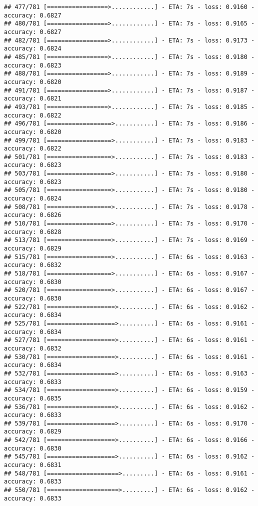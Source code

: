 \documentclass[
]{article}
\begin{document}
\begin{verbatim}
## 477/781 [=================>............] - ETA: 7s - loss: 0.9160 - accuracy: 0.6827
## 480/781 [=================>............] - ETA: 7s - loss: 0.9165 - accuracy: 0.6827
## 482/781 [=================>............] - ETA: 7s - loss: 0.9173 - accuracy: 0.6824
## 485/781 [=================>............] - ETA: 7s - loss: 0.9180 - accuracy: 0.6823
## 488/781 [=================>............] - ETA: 7s - loss: 0.9189 - accuracy: 0.6820
## 491/781 [=================>............] - ETA: 7s - loss: 0.9187 - accuracy: 0.6821
## 493/781 [=================>............] - ETA: 7s - loss: 0.9185 - accuracy: 0.6822
## 496/781 [==================>...........] - ETA: 7s - loss: 0.9186 - accuracy: 0.6820
## 499/781 [==================>...........] - ETA: 7s - loss: 0.9183 - accuracy: 0.6822
## 501/781 [==================>...........] - ETA: 7s - loss: 0.9183 - accuracy: 0.6823
## 503/781 [==================>...........] - ETA: 7s - loss: 0.9180 - accuracy: 0.6823
## 505/781 [==================>...........] - ETA: 7s - loss: 0.9180 - accuracy: 0.6824
## 508/781 [==================>...........] - ETA: 7s - loss: 0.9178 - accuracy: 0.6826
## 510/781 [==================>...........] - ETA: 7s - loss: 0.9170 - accuracy: 0.6828
## 513/781 [==================>...........] - ETA: 7s - loss: 0.9169 - accuracy: 0.6829
## 515/781 [==================>...........] - ETA: 6s - loss: 0.9163 - accuracy: 0.6832
## 518/781 [==================>...........] - ETA: 6s - loss: 0.9167 - accuracy: 0.6830
## 520/781 [==================>...........] - ETA: 6s - loss: 0.9167 - accuracy: 0.6830
## 522/781 [===================>..........] - ETA: 6s - loss: 0.9162 - accuracy: 0.6834
## 525/781 [===================>..........] - ETA: 6s - loss: 0.9161 - accuracy: 0.6834
## 527/781 [===================>..........] - ETA: 6s - loss: 0.9161 - accuracy: 0.6832
## 530/781 [===================>..........] - ETA: 6s - loss: 0.9161 - accuracy: 0.6834
## 532/781 [===================>..........] - ETA: 6s - loss: 0.9163 - accuracy: 0.6833
## 534/781 [===================>..........] - ETA: 6s - loss: 0.9159 - accuracy: 0.6835
## 536/781 [===================>..........] - ETA: 6s - loss: 0.9162 - accuracy: 0.6833
## 539/781 [===================>..........] - ETA: 6s - loss: 0.9170 - accuracy: 0.6829
## 542/781 [===================>..........] - ETA: 6s - loss: 0.9166 - accuracy: 0.6830
## 545/781 [===================>..........] - ETA: 6s - loss: 0.9162 - accuracy: 0.6831
## 548/781 [====================>.........] - ETA: 6s - loss: 0.9161 - accuracy: 0.6833
## 550/781 [====================>.........] - ETA: 6s - loss: 0.9162 - accuracy: 0.6833

\end{verbatim}
\end{document}
